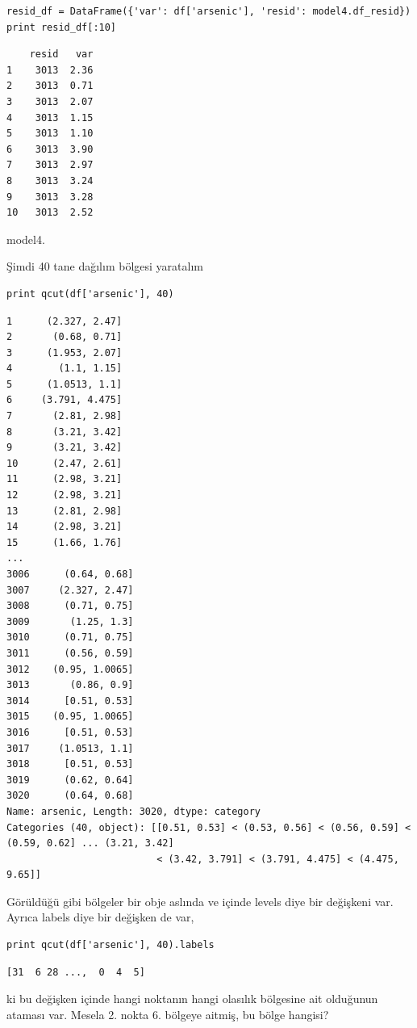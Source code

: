 \documentclass[12pt,fleqn]{article}\usepackage{../../common}
\begin{document}
\begin{verbatim}
resid_df = DataFrame({'var': df['arsenic'], 'resid': model4.df_resid})
print resid_df[:10]
\end{verbatim}

\begin{verbatim}
    resid   var
1    3013  2.36
2    3013  0.71
3    3013  2.07
4    3013  1.15
5    3013  1.10
6    3013  3.90
7    3013  2.97
8    3013  3.24
9    3013  3.28
10   3013  2.52
\end{verbatim}model4.

Şimdi 40 tane dağılım bölgesi yaratalım

\begin{verbatim}
print qcut(df['arsenic'], 40)
\end{verbatim}

\begin{verbatim}
1      (2.327, 2.47]
2       (0.68, 0.71]
3      (1.953, 2.07]
4        (1.1, 1.15]
5      (1.0513, 1.1]
6     (3.791, 4.475]
7       (2.81, 2.98]
8       (3.21, 3.42]
9       (3.21, 3.42]
10      (2.47, 2.61]
11      (2.98, 3.21]
12      (2.98, 3.21]
13      (2.81, 2.98]
14      (2.98, 3.21]
15      (1.66, 1.76]
...
3006      (0.64, 0.68]
3007     (2.327, 2.47]
3008      (0.71, 0.75]
3009       (1.25, 1.3]
3010      (0.71, 0.75]
3011      (0.56, 0.59]
3012    (0.95, 1.0065]
3013       (0.86, 0.9]
3014      [0.51, 0.53]
3015    (0.95, 1.0065]
3016      [0.51, 0.53]
3017     (1.0513, 1.1]
3018      [0.51, 0.53]
3019      (0.62, 0.64]
3020      (0.64, 0.68]
Name: arsenic, Length: 3020, dtype: category
Categories (40, object): [[0.51, 0.53] < (0.53, 0.56] < (0.56, 0.59] <
(0.59, 0.62] ... (3.21, 3.42] 
                          < (3.42, 3.791] < (3.791, 4.475] < (4.475, 9.65]] 
\end{verbatim}

Görüldüğü gibi bölgeler bir obje aslında ve içinde levels diye bir değişkeni
var. Ayrıca labels diye bir değişken de var,

\begin{verbatim}
print qcut(df['arsenic'], 40).labels
\end{verbatim}

\begin{verbatim}
[31  6 28 ...,  0  4  5]
\end{verbatim}

ki bu değişken içinde hangi noktanın hangi olasılık bölgesine ait olduğunun
ataması var. Mesela 2. nokta 6. bölgeye aitmiş, bu bölge hangisi?
\end{document}
